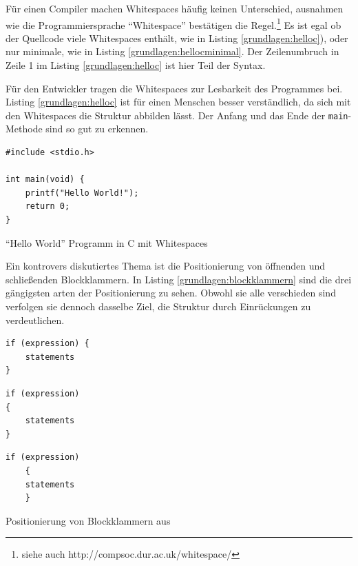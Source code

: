 Für einen Compiler machen Whitespaces häufig keinen Unterschied, ausnahmen wie die Programmiersprache \enquote{Whitespace} bestätigen die Regel.\footnote{siehe auch http://compsoc.dur.ac.uk/whitespace/}
Es ist egal ob der Quellcode viele Whitespaces enthält, wie in Listing \ref{grundlagen:helloc}), oder nur minimale, wie in Listing \ref{grundlagen:hellocminimal}.
Der Zeilenumbruch in Zeile 1 im Listing \ref{grundlagen:helloc} ist hier Teil der Syntax.

Für den Entwickler tragen die Whitespaces zur Lesbarkeit des Programmes bei. Listing \ref{grundlagen:helloc} ist für einen Menschen besser verständlich, da sich mit den Whitespaces die Struktur abbilden lässt. Der Anfang und das Ende der \texttt{main}-Methode sind so gut zu erkennen.

\begin{listing}[H]
    \begin{verbatim}
#include <stdio.h>

int main(void) {
    printf("Hello World!");
    return 0;
}
    \end{verbatim}
    \caption{\enquote{Hello World} Programm in C mit Whitespaces}
    \label{grundlagen:helloc}
\end{listing}

Ein kontrovers diskutiertes Thema ist die Positionierung von öffnenden
und schließenden Blockklammern.
In Listing \ref{grundlagen:blockklammern} sind die drei gängigsten
arten der Positionierung zu sehen. Obwohl sie alle verschieden sind verfolgen
sie dennoch dasselbe Ziel, die Struktur durch Einrückungen zu verdeutlichen.

\begin{listing}[H]
        \begin{minipage}{0.35\textwidth}
            \centering
	    \begin{verbatim}
if (expression) {
    statements
}
	    \end{verbatim}
        \end{minipage}
        \begin{minipage}{0.3\textwidth}
            \centering
	    \begin{verbatim}
if (expression)
{
    statements
}
	    \end{verbatim}
        \end{minipage}
        \begin{minipage}{0.3\textwidth}
            \centering
	    \begin{verbatim}
if (expression)
	{
    statements
	}
	    \end{verbatim}
        \end{minipage}
    \caption{Positionierung von Blockklammern aus \cite[S. 8]{Green}}
    \label{grundlagen:blockklammern}
\end{listing}

